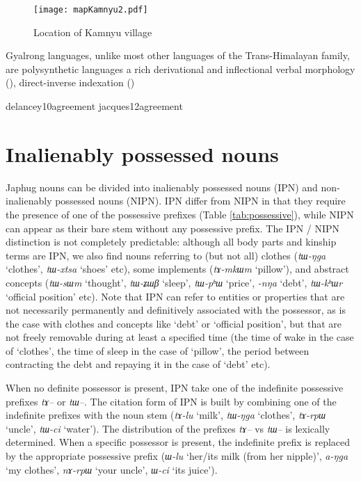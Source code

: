 \documentclass[oldfontcommands,oneside,a4paper,11pt]{article}
\newcommand{\ipa}[1]{{\phon\textit{#1}}} %
\begin{document}
\begin{figure}[H]
\centering
\label{fig:kamnyu}
\caption{Location of Kamnyu village}
\texttt{[image: mapKamnyu2.pdf]}
\end{figure}

Gyalrong languages, unlike most other languages of the Trans-Himalayan family, are polysynthetic languages a rich derivational and inflectional verbal morphology (\citealt{jacques12incorp, jackson14morpho}), direct-inverse indexation (\citealt{delancey81direction, jackson02rentongdengdi, jacques10inverse, gongxun14agreement})


delancey10agreement
jacques12agreement

 \section{Inalienably possessed nouns} 
Japhug nouns can be divided into inalienably possessed nouns (IPN) and non-inalienably possessed nouns (NIPN). IPN differ from NIPN in that they require the presence of one of the possessive prefixes (Table \ref{tab:possessive}), while NIPN can appear as their bare stem without any possessive prefix. The IPN / NIPN distinction is not completely predictable: although all body parts and kinship terms are IPN, we also find nouns referring to (but not all) clothes (\ipa{tɯ-ŋga} `clothes', \ipa{tɯ-xtsa} `shoes' etc), some implements (\ipa{tɤ-mkɯm} `pillow'), and abstract concepts (\ipa{tɯ-sɯm} `thought', \ipa{tɯ-ʑɯβ} `sleep', \ipa{tɯ-pʰɯ} `price', \ipa{-nŋa} `debt', \ipa{tɯ-kʰɯr} `official position' etc). Note that IPN can refer to entities or properties that are not necessarily permanently and definitively associated with the possessor, as is the case with clothes and concepts like `debt' or `official position', but that are not freely removable during at least a specified time (the time of wake in the case of `clothes', the time of sleep in the case of `pillow', the period between contracting the debt and repaying it in the case of `debt' etc).

When no definite possessor is present, IPN take one of the indefinite possessive prefixes \ipa{tɤ--} or \ipa{tɯ--}. The citation form of IPN is built by combining one of the indefinite prefixes with the noun stem (\ipa{tɤ-lu} `milk', \ipa{tɯ-ŋga} `clothes', \ipa{tɤ-rpɯ} `uncle', \ipa{tɯ-ci} `water'). The distribution of the prefixes \ipa{tɤ--} vs \ipa{tɯ--} is lexically determined.  When a specific possessor is present, the indefinite prefix is replaced by the appropriate possessive prefix (\ipa{ɯ-lu} `her/its milk (from her nipple)', \ipa{a-ŋga} `my clothes', \ipa{nɤ-rpɯ} `your uncle', \ipa{ɯ-ci} `its juice'). 
\end{document}
